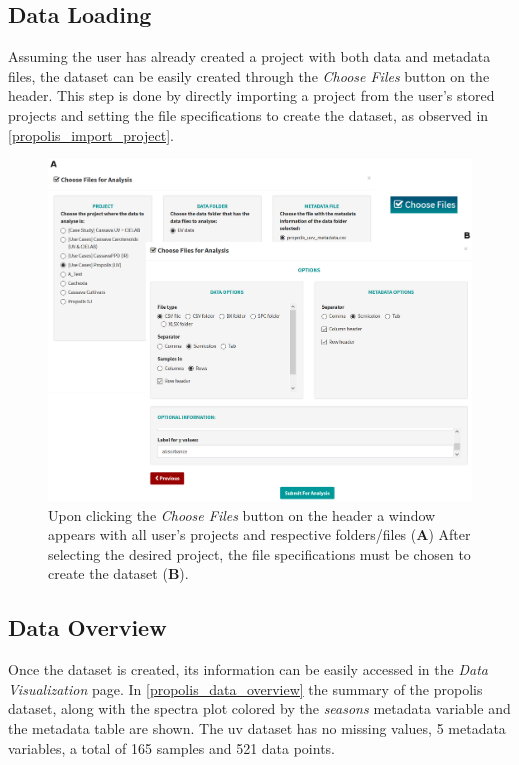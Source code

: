 \subsection{Data Loading} \label{propolis_loading}

Assuming the user has already created a project with both data and metadata files, the dataset can be easily created through the \textit{Choose Files} button on the header. This step is done by directly importing a project from the user's stored projects and setting the file specifications to create the dataset, as observed in \autoref{propolis_import_project}.

\begin{figure}[h]
	\centering
	\includegraphics[width=1\linewidth]{Imagens/Propolis/import_project}
	\caption{Upon clicking the \textit{Choose Files} button on the header a window appears with all user's projects and respective folders/files (\textbf{A}) After selecting the desired project, the file specifications must be chosen to create the dataset (\textbf{B}).}
	\label{propolis_import_project}
\end{figure}


\subsection{Data Overview}

Once the dataset is created, its information can be easily accessed in the \textit{Data Visualization} page. In \autoref{propolis_data_overview} the summary of the propolis dataset, along with the spectra plot colored by the \textit{seasons} metadata variable and the metadata table are shown. The \gls{uv} dataset has no missing values, 5 metadata variables, a total of 165 samples and 521 data points.


